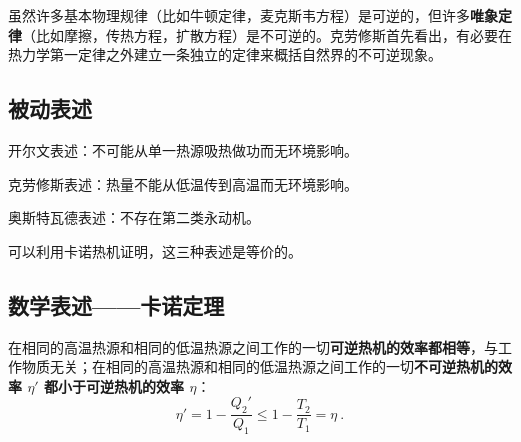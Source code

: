
\begin{issues}
\issueDraft
\end{issues}


虽然许多基本物理规律（比如牛顿定律，麦克斯韦方程）是可逆的，但许多\textbf{唯象定律}（比如摩擦，传热方程，扩散方程）是不可逆的。克劳修斯首先看出，有必要在热力学第一定律之外建立一条独立的定律来概括自然界的不可逆现象。

\subsection{被动表述}
开尔文表述：不可能从单一热源吸热做功而无环境影响。

克劳修斯表述：热量不能从低温传到高温而无环境影响。

奥斯特瓦德表述：不存在第二类永动机。

可以利用卡诺热机证明，这三种表述是等价的。

\subsection{数学表述——卡诺定理}\label{sub_Td2Law_1}

在相同的高温热源和相同的低温热源之间工作的一切\textbf{可逆热机的效率都相等}，与工作物质无关；在相同的高温热源和相同的低温热源之间工作的一切\textbf{不可逆热机的效率 $\eta'$ 都小于可逆热机的效率 $\eta$}：
\begin{equation}
\eta'=1-\frac{Q_2'}{Q_1}\le 1-\frac{T_2}{T_1}=\eta~.
\end{equation}

